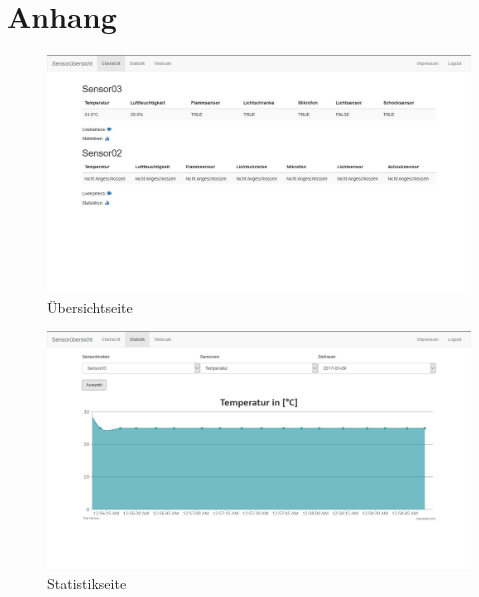 \chapter*{Anhang}
\begin{landscape}
	\begin{figure}[htb]
		\includegraphics[width=\linewidth, height=.9\textheight]{Bilder/Anhang/uebersicht.jpg}
		\caption[Übersichtseite]{Übersichtseite}
		\label{uebersichtseite}
	\end{figure}
\end{landscape}
\begin{landscape}
	\begin{figure}[htb]
		\includegraphics[width=\linewidth, height=.9\textheight]{Bilder/Anhang/statistik.jpg}
		\caption[Statistikseite]{Statistikseite}
		\label{statistikseite}
	\end{figure}
\end{landscape}
